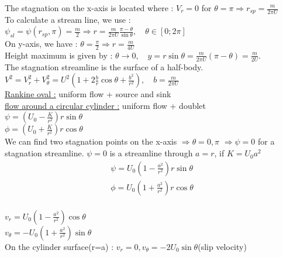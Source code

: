 \documentclass[../main.tex]{subfiles}
\begin{document}
The stagnation on the x-axis is located where : $V_r = 0$ for $\theta=\pi \Rightarrow r_{sp} = \frac{m}{2\pi U}$\\

To calculate a stream line, we use : $\psi_{sl} = \psi(r_{sp},\pi) = \frac{m}{2} \Rightarrow r = \frac{m}{2\pi U} \frac{\pi - \theta}{\sin{\theta}}, \quad \theta \in [0;2\pi]$\\

On y-axis, we have : $\theta = \frac{\pi}{2} \Rightarrow r = \frac{m}{4 U}$\\

Height maximum is given by : $\theta \to 0, \quad y=r\sin{\theta} = \frac{m}{2\pi U}(\pi-\theta) = \frac{m}{2U}$.\\
The stagnation streamline is the surface of a half-body.\\

$V^2 = V_r^2 + V_\theta^2 = U^2 (1+2\frac{b}{r}\cos{\theta} + \frac{b^2}{r^2}), \quad b= \frac{m}{2\pi U}$\\

\quad \underline{Rankine oval :} uniform flow + source and sink\\

\quad \underline{flow around a circular cylinder :} uniform flow + doublet\\

$\psi = (U_0 - \frac{K}{r^2})r\sin{\theta}$\\
$\phi = (U_0+\frac{K}{r^2})r\cos{\theta}$\\

We can find two stagnation points on the x-axis $\Rightarrow \theta = 0,\pi$ $\Rightarrow \psi = 0$ for a stagnation streamline. $\psi = 0$ is a streamline through $a=r$, if $K = U_0 a^2$\\

\begin{equation}
    \begin{gathered}
        \psi = U_0(1-\frac{a^2}{r^2})r\sin{\theta}\\
        \phi = U_0(1+\frac{a^2}{r^2})r\cos{\theta}\\
    \end{gathered}
\end{equation}

$v_r = U_0(1-\frac{a^2}{r^2})\cos{\theta}$\\
$v_\theta = -U_0(1+\frac{a^2}{r^2})\sin{\theta}$\\

On the cylinder surface(r=a) : $v_r = 0, v_\theta = -2U_0 \sin{\theta}$(slip velocity)\\
\end{document}
